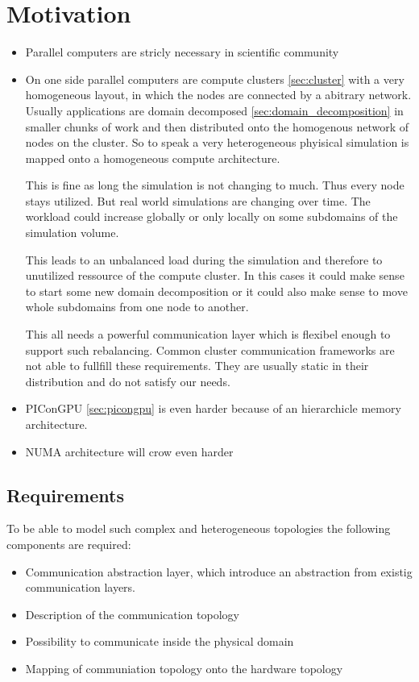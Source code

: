 \section{Motivation}
\begin{itemize}
\item Parallel computers are stricly necessary in scientific community
\item On one side parallel computers are compute clusters
  \ref{sec:cluster} with a very homogeneous layout, in which the nodes
  are connected by a abitrary network.  Usually applications are
  domain decomposed \ref{sec:domain_decomposition} in smaller chunks
  of work and then distributed onto the homogenous network of nodes on
  the cluster.  So to speak a very heterogeneous phyisical simulation
  is mapped onto a homogeneous compute architecture.

  This is fine as long the simulation is not changing to much. Thus
  every node stays utilized. But real world simulations are changing
  over time. The workload could increase globally or only locally on
  some subdomains of the simulation volume.

  This leads to an unbalanced load during the simulation and therefore
  to unutilized ressource of the compute cluster. In this cases it
  could make sense to start some new domain decomposition or it could
  also make sense to move whole subdomains from one node to another.

  This all needs a powerful communication layer which is flexibel
  enough to support such rebalancing. Common cluster communication
  frameworks are not able to fullfill these requirements. They are
  usually static in their distribution and do not satisfy our needs.

\item PIConGPU \ref{sec:picongpu} is even harder because of an
  hierarchicle memory architecture.
\item NUMA architecture will crow even harder
\end{itemize}

\subsection{Requirements}
To be able to model such complex and heterogeneous topologies the
following components are required:

\begin{itemize}
\item Communication abstraction layer, which introduce an abstraction
  from existig communication layers.
\item Description of the communication topology
\item Possibility to communicate inside the physical domain
\item Mapping of communiation topology onto the hardware topology
\end{itemize}

